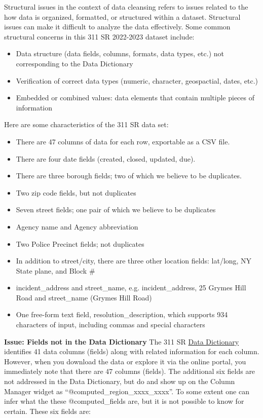 \documentclass[12pt, titlepage]{article}
\begin{document}
Structural issues in the context of data cleansing refers to issues 
related to the how data is organized, formatted, or structured within a dataset. Structural issues 
can make it difficult to analyze the data effectively. Some common 
structural concerns in this 311 SR 2022-2023 dataset include:

\begin{itemize}
	\item Data structure (data fields, columns, formats, data types, etc.) 
	not corresponding to the Data Dictionary
	\item Verification of correct data types (numeric, character, geospactial, dates, etc.)
	\item Embedded or combined values: data elements that 
	contain multiple pieces of information 
\end{itemize}

Here are some characteristics of the 311 SR data set:

\begin{itemize}
	\item There are 47 columns of data for each row, exportable as a CSV file.
	\item There are four date fields (created, closed, updated, due).
	\item There are three borough fields; two of which we believe to be duplicates.
	\item Two zip code fields, but not duplicates
	\item Seven street fields; one pair of which we believe to be duplicates
	\item Agency name and Agency abbreviation
	\item Two Police Precinct fields; not duplicates
	\item In addition to street/city, there are three other location fields: 
	lat/long, NY State plane, and Block \#
	\item incident\_address and street\_name, e.g. incident\_address, 
	25 Grymes Hill Road and street\_name (Grymes Hill Road)
	\item One free-form text field, resolution\_description, which 
	supports 934 characters of input, including commas and special characters
\end{itemize}


\textbf{Issue: Fields not in the Data Dictionary} The 311 SR 
\href{https://data.cityofnewyork.us/api/views/erm2-nwe9/files/b372b884-f86a-453b-ba16-1fe06ce9d212?download=true&filename=311_ServiceRequest_2010-Present_DataDictionary_Updated_2023.xlsx}{Data Dictionary}
 identifies 41 data columns (fields) along with related information 
 for each column. However, when you download the data or 
 explore it via the online portal, you immediately note that there 
 are 47 columns (fields). The additional six fields are not addressed in the 
 Data Dictionary, but do and show up on the Column Manager widget
 as ``@computed\_region\_xxxx\_xxxx''. To some extent one can infer 
 what the these @computed\_fields are, but it is not possible to know 
 for certain. These six fields are:
\end{document}

